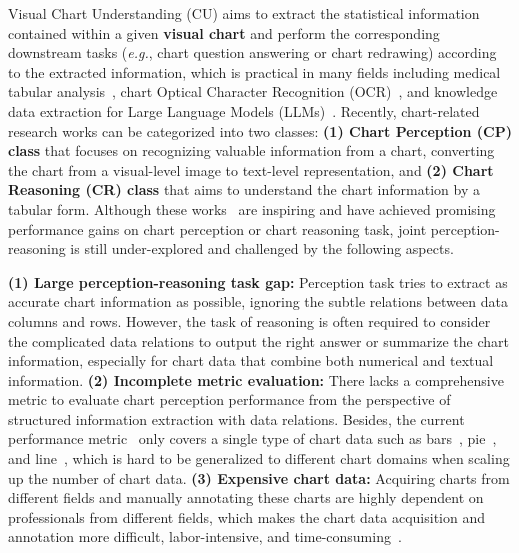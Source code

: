 \documentclass{article} \usepackage{iclr2024_conference,times}
\begin{document}
Visual Chart Understanding (CU) aims to extract the statistical information contained within a given \textbf{visual chart} and perform the corresponding downstream tasks (\textit{e.g.}, chart question answering or chart redrawing) according to the extracted information, which is practical in many fields including medical tabular analysis~\citep{ulmer2020trust}, chart Optical Character Recognition (OCR)~\citep{Luo2021ChartOCRDE, hegselmann2023tabllm, Obeid2020CharttoTextGN, Masry2022ChartQAAB}, and knowledge data extraction for Large Language Models (LLMs)~\citep{Brown2020gpt, chung2022scaling, he2022masked}. Recently, chart-related research works can be categorized into two classes: \textbf{(1) Chart Perception (CP) class} that focuses on recognizing valuable information from a chart, converting the chart from a visual-level image to text-level representation, and \textbf{(2) Chart Reasoning (CR) class} that aims to understand the chart information by a tabular form. Although these works~\citep{Masry2022ChartQAAB,raffel2020exploring,Luo2021ChartOCRDE,chung2022scaling} are inspiring and have achieved promising performance gains on chart perception or chart reasoning task, joint perception-reasoning is still under-explored and challenged by the following aspects.

\textbf{(1) Large perception-reasoning task gap:} Perception task tries to extract as accurate chart information as possible, ignoring the subtle relations between data columns and rows. However, the task of reasoning is often required to consider the complicated data relations to output the right answer or summarize the chart information, especially for chart data that combine both numerical and textual information. \textbf{(2) Incomplete metric evaluation:} There lacks a comprehensive metric to evaluate chart perception performance from the perspective of structured information extraction with data relations. Besides, the current performance metric~\citep{Masry2022ChartQAAB} only covers a single type of chart data such as bars~\citep{Choi2019VisualizingFT}, pie~\citep{Liu2019DataEF}, and line~\citep{Luo2021ChartOCRDE}, which is hard to be generalized to different chart domains when scaling up the number of chart data. \textbf{(3) Expensive chart data:} Acquiring charts from different fields and manually annotating these charts are highly dependent on professionals from different fields, which makes the chart data acquisition and annotation more difficult, labor-intensive, and time-consuming~\citep{ulmer2020trust}.
\end{document}
